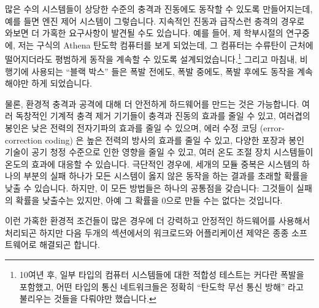 많은 수의 시스템들이 상당한 수준의 충격과 진동에도 동작할 수 있도록
만들어지는데, 예를 들면 엔진 제어 시스템이 그렇습니다.
지속적인 진동과 급작스런 충격의 경우로 와보면 더 가혹한 요구사항이 발견될 수도
있습니다.
예를 들어, 제 학부시절의 연구중에, 저는 구식의 Athena 탄도학 컴퓨터를 보게
되었는데, 그 컴퓨터는 수류탄이 근처에 떨어지더라도 평범하게 동작을 계속할 수
있도록 설계되었습니다.\footnote{
	10여년 후, 일부 타입의 컴퓨터 시스템들에 대한 적합성 테스트는 커다란
	폭발을 포함했고, 어떤 타입의 통신 네트워크들은 정확히 ``탄도학 무선
	통신 방해'' 라고 불리우는 것들을 다뤄야만 했습니다.}
그리고 마침내, 비행기에 사용되는 ``블랙 박스'' 들은 폭발 전에도, 폭발 중에도,
폭발 후에도 동작을 계속해야만 하게 되었습니다.

물론, 환경적 충격과 공격에 대해 더 안전하게 하드웨어를 만드는 것은 가능합니다.
여러 독창적인 기계적 충격 제거 기기들이 충격과 진동의 효과를 줄일 수 있고,
여러겹의 봉인은 낮은 전력의 전자기파의 효과를 줄일 수 있으며, 에러 수정 코딩
(error-correction coding) 은 높은 전력의 방사의 효과를 줄일 수 있고, 다양한
포장과 봉인 기술이 공기 청정 수준으로 인한 영향을 줄일 수 있고, 여러 온도 조절
장치 시스템들이 온도의 효과에 대응할 수 있습니다.
극단적인 경우에, 세개의 모듈 중복은 시스템의 하나의 부분의 실패 하나가 모든
시스템이 옳지 않은 동작을 하는 결과를 초래할 확률을 낮출 수 있습니다.
하지만, 이 모든 방법들은 하나의 공통점을 갖습니다: 그것들이 실패의 확률을
낮출수는 있지만, 아예 그 확률을 0으로 만들 수는 없다는 것입니다.

이런 가혹한 환경적 조건들이 많은 경우에 더 강력하고 안정적인 하드웨어를
사용해서 처리되곤 하지만 다음 두개의 섹션에서의 워크로드와 어플리케이션 제약은
종종 소프트웨어로 해결되곤 합니다.
\iffalse

